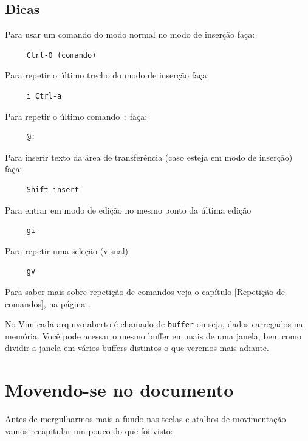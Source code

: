 \documentclass[10pt,a4paper,openany]{book}
\begin{document}
\section{Dicas}
\label{Dicas}
Para usar um comando do modo normal no modo de inserção faça:

\begin{verbatim}
     Ctrl-O (comando)
\end{verbatim}

Para repetir o último trecho do modo de inserção faça:

\begin{verbatim}
     i Ctrl-a
\end{verbatim}

Para repetir o último comando \verb+:+ faça:

\begin{verbatim}
     @:
\end{verbatim}

Para inserir texto da área de transferência (caso esteja em modo de inserção) faça:

\begin{verbatim}
     Shift-insert
\end{verbatim}

Para entrar em modo de edição no mesmo ponto da última edição

\begin{verbatim}
     gi
\end{verbatim}

Para repetir uma seleção (visual)

\begin{verbatim}
     gv
\end{verbatim}

Para saber mais sobre repetição de comandos veja o capítulo \ref{Repetição de comandos},
na página \pageref{Repetição de comandos}.

No Vim cada arquivo aberto é chamado de \verb|buffer| ou seja, dados
carregados na memória. Você pode acessar o mesmo buffer em mais de uma
janela, bem como dividir a janela em vários buffers distintos o que veremos
mais adiante.

\chapter{Movendo-se no documento}\label{cha:Movendo-se no documento}

Antes de mergulharmos mais a fundo nas teclas e atalhos de
movimentação vamos recapitular um pouco do que foi visto: \\
\end{document}
